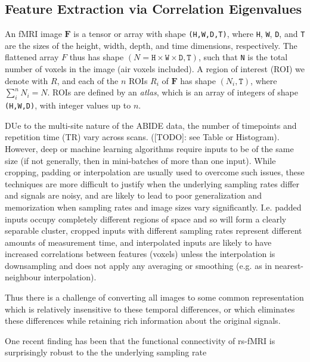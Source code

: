 \documentclass[10pt]{article}
\begin{document}
\subsection{Feature Extraction via Correlation Eigenvalues}

An fMRI image \(\bm{F}\) is a tensor or array with shape \texttt{(H,W,D,T)}, where \texttt{H},
\texttt{W}, \texttt{D}, and \texttt{T} are the sizes of the height, width, depth, and time
dimensions, respectively. The flattened array \(F\) thus has shape \((N = \texttt{H} \times
\texttt{W} \times \texttt{D}, \texttt{T})\), such that \texttt{N} is the total number of voxels in
the image (air voxels included). A region of interest (ROI) we denote with \(R\), and each of the
\(n\) ROIs \(R_i\) of \(\bm{F}\) has shape \((N_i, \texttt{T})\), where \(\sum_i^n N_i= N\). ROIs
are defined by an \emph{atlas}, which is an array of integers of shape \texttt{(H,W,D)}, with
integer values up to \(n\).

DUe to the multi-site nature of the ABIDE data, the number of timepoints and repetition time (TR)
vary across scans. ([TODO]: see Table or Histogram). However, deep or machine learning algorithms
require inputs to be of the same size (if not generally, then in mini-batches of more than one
input). While cropping, padding or interpolation are usually used to overcome such issues, these
techniques are more difficult to justify when the underlying sampling rates differ and signals are
noisy, and are likely to lead to poor generalization and memorization when sampling rates and image
sizes vary significantly. I.e. padded inputs occupy completely different regions of space and so
will form a clearly separable cluster, cropped inputs with different sampling rates represent
different amounts of measurement time, and interpolated inputs are likely to have increased
correlations between features (voxels) unless the interpolation is downsampling and does not apply
any averaging or smoothing (e.g. as in nearest-neighbour interpolation).

Thus there is a challenge of converting all images to some common representation which is relatively
insensitive to these temporal differences, or which eliminates these differences while retaining
rich information about the original signals.

One recent finding has been that the functional connectivity of rs-fMRI is surprisingly robust to the
the underlying sampling rate \citep{huotariSamplingRateEffects2019,shakilEvaluationSlidingWindow2016}
\end{document}
